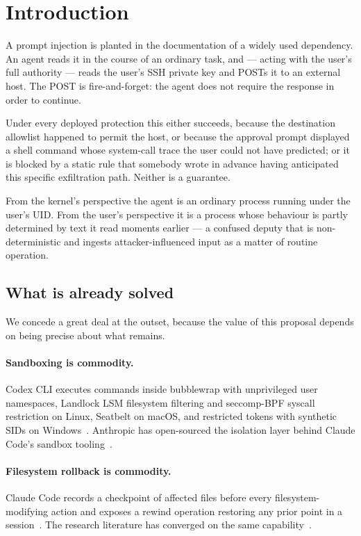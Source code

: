 \documentclass[10pt,twocolumn]{article}
\begin{document}
\section{Introduction}

A prompt injection is planted in the documentation of a widely used dependency.
An agent reads it in the course of an ordinary task, and --- acting with the
user's full authority --- reads the user's SSH private key and POSTs it to an
external host. The POST is fire-and-forget: the agent does not require the
response in order to continue.

Under every deployed protection this either succeeds, because the destination
allowlist happened to permit the host, or because the approval prompt displayed
a shell command whose system-call trace the user could not have predicted; or it
is blocked by a static rule that somebody wrote in advance having anticipated
this specific exfiltration path. Neither is a guarantee.

From the kernel's perspective the agent is an ordinary process running under the
user's UID. From the user's perspective it is a process whose behaviour is
partly determined by text it read moments earlier --- a confused deputy that is
non-deterministic and ingests attacker-influenced input as a matter of routine
operation.

\subsection{What is already solved}

We concede a great deal at the outset, because the value of this proposal
depends on being precise about what remains.

\paragraph{Sandboxing is commodity.} Codex CLI executes commands inside
bubblewrap with unprivileged user namespaces, Landlock LSM filesystem filtering
and seccomp-BPF syscall restriction on Linux, Seatbelt on macOS, and restricted
tokens with synthetic SIDs on Windows~\cite{codexsandbox}. Anthropic has
open-sourced the isolation layer behind Claude Code's sandbox
tooling~\cite{sandboxescapes}.

\paragraph{Filesystem rollback is commodity.} Claude Code records a checkpoint
of affected files before every filesystem-modifying action and exposes a rewind
operation restoring any prior point in a session~\cite{ccrewind}. The research
literature has converged on the same capability~\cite{ftsandbox2025,
deltabox2026}.
\end{document}
